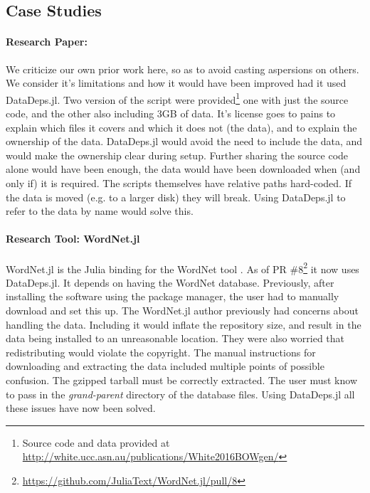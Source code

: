 \documentclass[dvinames]{josr}
\begin{document}
\subsection{Case Studies}\label{sec:case-studies}
\paragraph{Research Paper: \citet{White2015BOWgen}}
We criticize our own prior work here, so as to avoid casting aspersions on others. We consider it's limitations and how it would have been improved had it used DataDeps.jl.
%
Two version of the script were provided\footnote{Source code and data provided at \url{http://white.ucc.asn.au/publications/White2016BOWgen/}}
one with just the source code, and the other also including 3GB of data.
It's license goes to pains to explain which files it covers and which it does not (the data), and to explain the ownership of the data.
DataDeps.jl would avoid the need to include the data, and would make the ownership clear during setup.
Further sharing the source code alone would have been enough, the data would have been downloaded when  (and only if) it is required.
%
The scripts themselves have relative paths hard-coded. If the data is moved (e.g. to a larger disk) they will break.
Using DataDeps.jl to refer to the data by name would solve this.


\paragraph{Research Tool: WordNet.jl}\label{sec:research-tool-wordnetjl}
WordNet.jl is the Julia binding for the WordNet tool \citep{miller1995wordnet}.
As of PR \#8\footnote{\url{https://github.com/JuliaText/WordNet.jl/pull/8}} it now uses DataDeps.jl.
It depends on having the WordNet database.
Previously, after installing the software using the package manager,
the user had to manually download and set this up.
%
The WordNet.jl author previously had concerns about handling the data.
Including it would inflate the repository size, and result in the data being installed to an unreasonable location.
They were also worried that redistributing would violate the copyright.
%
The manual instructions for downloading and extracting the data included multiple points of possible confusion.
The gzipped tarball must be correctly extracted.
The user must know to pass in the \emph{grand-parent} directory of the database files.
Using DataDeps.jl all these issues have now been solved.
\end{document}
